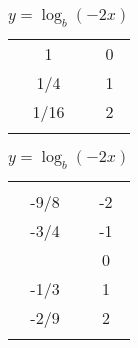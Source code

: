 \begin{exercises}
\begin{table}[htb]
\begin{widepage}
\begin{subtable}{.2\textwidth}
\begin{tabular}{S[table-format=1.0]S[table-format=1.0]}
			1             & 0             \\  \normalline
			\num{1/4}     & 1             \\  \normalline
			\num{1/16}    & 2             \\  \lastline
		\end{tabular}
	\end{subtable}%
	\hfill
	\begin{subtable}{.2\textwidth}
		\centering
		\caption{$y=\log_b(-2x)$}
		\label{log:tab:findbase4}
		\begin{tabular}{S[table-format=1.0]S[table-format=1.0]}
			\beforeheading 
			 &  \\
			\afterheading
			\num{-9/8}    & -2            \\  \normalline
			\num{-3/4}    & -1            \\              & 0             \\  \normalline
			\num{-1/3}    & 1             \\  \normalline
			\num{-2/9}    & 2             \\  \lastline
		\end{tabular}
	\end{subtable}%
	\end{widepage}
\end{table} 



\end{exercises}
